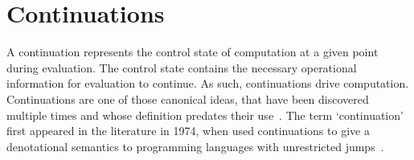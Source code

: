 \documentclass[12pt,phd,lfcs,twoside,openright,logo,leftchapter,normalheadings]{infthesis}
\theoremstyle{plain}
\theoremstyle{definition}
\begin{document}



\chapter{Continuations}
\label{ch:continuations}

A continuation represents the control state of computation at a given
point during evaluation. The control state contains the necessary
operational information for evaluation to continue. As such,
continuations drive computation. %
%
Continuations are one of those canonical ideas, that have been
discovered multiple times and whose definition predates their
use~\cite{Reynolds93}. The term `continuation' first appeared in the
literature in 1974, when \citet{StracheyW74} used continuations to
give a denotational semantics to programming languages with
unrestricted jumps~\cite{StracheyW00}.
\end{document}
